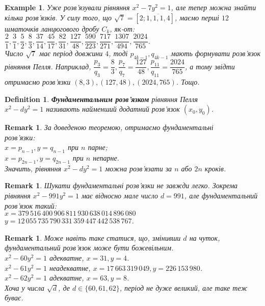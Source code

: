 \documentclass[a4paper, 14pt]{extarticle}
\theoremstyle{theoremdd}
\theoremstyle{theoremdd}
\newtheorem{definition}[theorem]{Definition}
\theoremstyle{theoremdd}
\theoremstyle{theoremdd}
\newtheorem{example}[theorem]{Example}
\theoremstyle{theoremdd}
\theoremstyle{theoremdd}
\newtheorem{remark}[theorem]{Remark}
\theoremstyle{theoremdd}
\theoremstyle{theoremdd}
\begin{document}
\begin{example}
Уже розв'язували рівняння $x^2 - 7y^2 = 1$, але тепер можна знайти кілька розв'язків. У силу того, що $\sqrt{7} = [2;\overline{1,1,1,4}]$, маємо перші $12$ шматочків ланцюгового дробу $C_k$, як-от:\\
$\dfrac{2}{1}, \dfrac{3}{1}, \dfrac{5}{2}, \dfrac{8}{3}, \dfrac{37}{14}, \dfrac{45}{17}, \dfrac{82}{31}, \dfrac{127}{48}, \dfrac{590}{223}, \dfrac{717}{271}, \dfrac{1307}{494}, \dfrac{2024}{765}$.\\
Число $\sqrt{7}$ має період довжини $4$, тоді $p_{4k-1}, q_{4k-1}$ мають формувати розв'язок рівняння Пелля. Наприклад, $\dfrac{p_3}{q_3} = \dfrac{8}{3}, \dfrac{p_7}{q_7} = \dfrac{127}{48}, \dfrac{p_{11}}{q_{11}} = \dfrac{2024}{765}$, а тому звідти отримаємо розв'язки $(8,3), (127,48), (2024, 765)$. Тощо.
\end{example}

\begin{definition}
\textbf{Фундаментальним розв'язком} рівняння Пелля \\ $x^2 - dy^2 = 1$ називають найменший додатний розв'язок $(x_0,y_0)$.
\end{definition}

\begin{remark}
За доведеною теоремою, отримаємо фундаментальні \\ розв'язки:\\
$x = p_{n-1}, y = q_{n-1}$ при $n$ парне;\\
$x = p_{2n-1}, y = q_{2n-1}$ при $n$ непарне.\\
Значить, рівняння $x^2 - dy^2 = 1$ можна розв'язати за $n$ або $2n$ кроків.
\end{remark}

\begin{remark}
Шукати фундаментальні розв'язки не завжди легко. Зокрема рівняння $x^2 - 991y^2 = 1$ має відносно мале число $d = 991$, але фундаментальний розв'язок такий:\\
$x = 379\,516\,400\,906\,811\,930\,638\,014\,896\,080$\\
$y = 12\,055\,735\,790\,331\,359\,447\,442\,538\,767$.
\end{remark}

\begin{remark}
Може навіть таке статися, що, змінивши $d$ на чуток, фундаментальний розв'язок може бути божевільним.\\
$x^2 - 60y^2 = 1$ адекватне, $x = 31, y = 4$.\\
$x^2 - 61y^2 = 1$ неадекватне, $x = 17\,663\,319\,049, y = 226\,153\,980$.\\
$x^2 - 62y^2 = 1$ адекватне, $x = 63, y = 8$.\\
Хоча у числа $\sqrt{d}$, де $d \in \{60,61,62\}$, період не дуже великий, але таке теж буває.
\end{remark}
\end{document}
